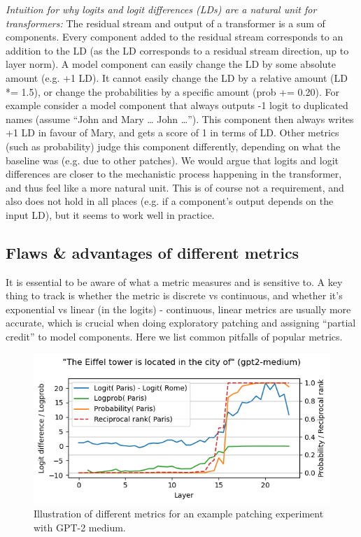 \documentclass[nonatbib]{article}
\begin{document}
\textit{Intuition for why logits and logit differences (LDs) are a natural unit for transformers:} The residual stream and output of a transformer is a sum of components. Every component added to the residual stream corresponds to an addition to the LD (as the LD corresponds to a residual stream direction, up to layer norm). A model component can easily change the LD by some absolute amount (e.g. +1 LD). It cannot easily change the LD by a relative amount (LD *= 1.5), or change the probabilities by a specific amount (prob += 0.20). For example consider a model component that always outputs -1 logit to duplicated names (assume “John and Mary … John …”). This component then always writes +1 LD in favour of Mary, and gets a score of 1 in terms of LD. Other metrics (such as probability) judge this component differently, depending on what the baseline was (e.g. due to other patches). We would argue that logits and logit differences are closer to the mechanistic process happening in the transformer, and thus feel like a more natural unit. This is of course not a requirement, and also does not hold in all places (e.g. if a component’s output depends on the input LD), but it seems to work well in practice.

\subsection{Flaws \& advantages of different metrics}
It is essential to be aware of what a metric measures and is sensitive to. A key thing to track is whether the metric is discrete vs continuous, and whether it’s exponential vs linear (in the logits) - continuous, linear metrics are usually more accurate, which is crucial when doing exploratory patching and assigning “partial credit” to model components. Here we list common pitfalls of popular metrics.

\begin{figure}[H]
  \centering
  \includegraphics[width=\textwidth]{03_paris.ipynb.png}
  \caption{Illustration of different metrics for an example patching experiment with GPT-2 medium.}
  \label{fig}
\end{figure}
\end{document}
